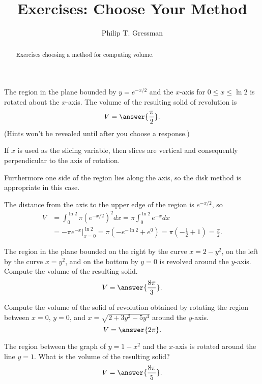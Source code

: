 \documentclass{ximera}
\title{Exercises: Choose Your Method}
\author{Philip T. Gressman}
\begin{document}
\begin{abstract}
Exercises choosing a method for computing volume.
\end{abstract}
\maketitle

\begin{exercise}%
The region in the plane bounded by $y = e^{-x/2}$ and the $x$-axis for $0 \leq x \leq \ln 2$ is rotated about the $x$-axis. The volume of the resulting solid of revolution is
\[ V = \answer{ \frac{\pi}{2}}. \]
(Hints won't be revealed until after you choose a response.)
\begin{feedback}
If $x$ is used as the slicing variable, then slices are vertical and consequently perpendicular to the axis of rotation. \begin{hint}
Furthermore one side of the region lies along the axis, so the disk method is appropriate in this case. 
\begin{hint}
The distance from the axis to the upper edge of the region is $e^{-x/2}$, so
\[ \begin{aligned} V & = \int_0^{\ln 2} \pi \left( e^{-x/2} \right)^2 dx = \pi \int_0^{\ln 2} e^{-x} dx \\ & =  \left. - \pi e^{-x} \right|_{x=0}^{\ln 2} = \pi (-e^{-\ln 2} + e^0) = \pi \left( - \frac{1}{2} + 1 \right) = \frac{\pi}{2}. \end{aligned}\]
\end{hint}
\end{hint}
\end{feedback}
\end{exercise}

\begin{exercise}
 The region in the plane bounded on the right by the curve $x = 2 - y^2$, on the left by the curve $x = y^2$, and on the bottom by $y = 0$ is revolved around the $y$-axis. Compute the volume of the resulting solid.
 \[ V = \answer{\frac{8 \pi}{3}}. \]
 \end{exercise}
 
 
 \begin{exercise}%
Compute the volume of the solid of revolution obtained by rotating the region between $x=0$, $y=0$, and $x=\sqrt{2+3y^2 - 5y^4}$ around the $y$-axis.
\[ V = \answer{2 \pi}. \]
\end{exercise}


\begin{exercise}%

The region between the graph of \(y = 1-x^2\) and the \(x\)-axis is rotated around the line \(y=1\). What is the volume of the resulting solid?
\[ V= \answer{ \frac{8 \pi}{5}}. \]
\end{exercise}
\end{document}
